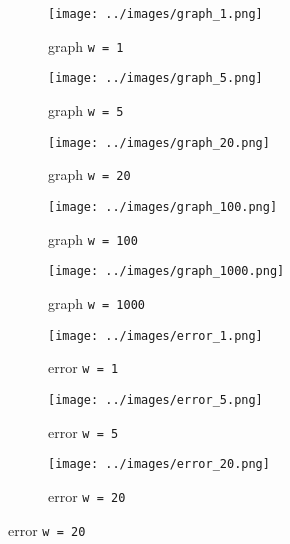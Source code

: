 \documentclass[../CSC_5RO16_TA_TP4.tex]{subfiles}
\begin{document}
\begin{figure}[H]
    \centering
    \begin{subfigure}[b]{0.19\textwidth}
        \centering
        \texttt{[image: ../images/graph\_1.png]}
        \caption{graph \texttt{w = 1}}
        \label{fig:methode_anticipative_1}
    \end{subfigure}\hfill
	\begin{subfigure}[b]{0.19\textwidth}
        \centering
        \texttt{[image: ../images/graph\_5.png]}
        \caption{graph \texttt{w = 5}}
        \label{fig:methode_anticipative_5}
    \end{subfigure}\hfill
    \begin{subfigure}[b]{0.19\textwidth}
        \centering
        \texttt{[image: ../images/graph\_20.png]}
        \caption{graph \texttt{w = 20}}
        \label{fig:methode_anticipative_20}
    \end{subfigure}\hfill
	\begin{subfigure}[b]{0.19\textwidth}
        \centering
        \texttt{[image: ../images/graph\_100.png]}
        \caption{graph \texttt{w = 100}}
        \label{fig:methode_anticipative_100}
    \end{subfigure}\hfill
	\begin{subfigure}[b]{0.19\textwidth}
        \centering
        \texttt{[image: ../images/graph\_1000.png]}
        \caption{graph \texttt{w = 1000}}
        \label{fig:methode_anticipative_1000}
    \end{subfigure}\hfill
    \begin{subfigure}[b]{0.19\textwidth}
        \centering
        \texttt{[image: ../images/error\_1.png]}
        \caption{error \texttt{w = 1}}
        \label{fig:methode_anticipative_error_1}
    \end{subfigure}\hfill
	\begin{subfigure}[b]{0.19\textwidth}
        \centering
        \texttt{[image: ../images/error\_5.png]}
        \caption{error \texttt{w = 5}}
        \label{fig:methode_anticipative_error_5}
    \end{subfigure}\hfill
    \begin{subfigure}[b]{0.19\textwidth}
        \centering
        \texttt{[image: ../images/error\_20.png]}
        \caption{error \texttt{w = 20}}
        \label{fig:methode_anticipative_error_20}
    \end{subfigure}\hfill

\end{figure}
\end{document}
